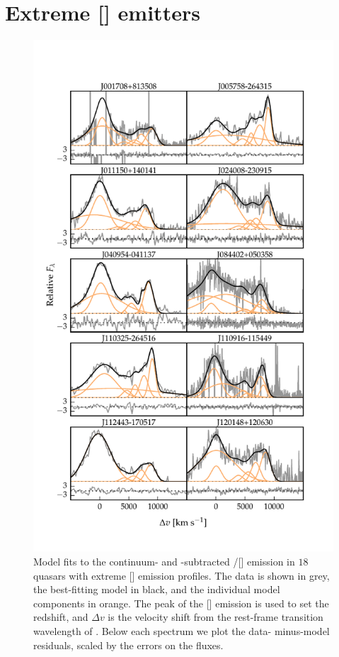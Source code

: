 \section{Extreme [] emitters}
\label{sec:extreme_oiii}

\begin{figure}
    \centering
    \includegraphics[width=\columnwidth]{figures/chapter04/example_spectrum_grid_extreme_oiii_1.pdf} 
    \caption[{Model fits to the continuum- and -subtracted \hbns/[] emission in $18$ quasars with extreme [] emission profiles.}]{Model fits to the continuum- and -subtracted \hbns/[] emission in $18$ quasars with extreme [] emission profiles. The data is shown in grey, the best-fitting model in black, and the individual model components in orange. The peak of the [] emission is used to set the redshift, and $\Delta{v}$ is the velocity shift from the rest-frame transition wavelength of \hbns. Below each spectrum we plot the data- minus-model residuals, scaled by the errors on the fluxes.}     
    \label{fig:example_spectrum_grid_extreme_oiii}
\end{figure}

